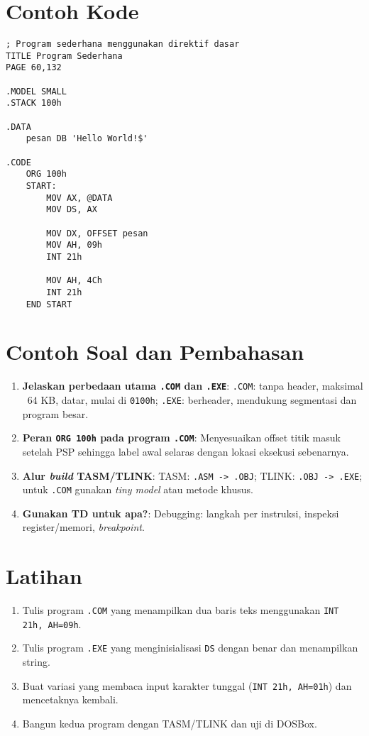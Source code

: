 \section{Contoh Kode}
\begin{verbatim}
; Program sederhana menggunakan direktif dasar
TITLE Program Sederhana
PAGE 60,132

.MODEL SMALL
.STACK 100h

.DATA
    pesan DB 'Hello World!$'

.CODE
    ORG 100h
    START:
        MOV AX, @DATA
        MOV DS, AX
        
        MOV DX, OFFSET pesan
        MOV AH, 09h
        INT 21h
        
        MOV AH, 4Ch
        INT 21h
    END START
\end{verbatim}

\section{Contoh Soal dan Pembahasan}
\begin{enumerate}
  \item \textbf{Jelaskan perbedaan utama \texttt{.COM} dan \texttt{.EXE}}: \texttt{.COM}: tanpa header, maksimal ~64 KB, datar, mulai di \texttt{0100h}; \texttt{.EXE}: berheader, mendukung segmentasi dan program besar.
  \item \textbf{Peran \texttt{ORG 100h} pada program \texttt{.COM}}: Menyesuaikan offset titik masuk setelah PSP sehingga label awal selaras dengan lokasi eksekusi sebenarnya.
  \item \textbf{Alur \textit{build} TASM/TLINK}: TASM: \texttt{.ASM -> .OBJ}; TLINK: \texttt{.OBJ -> .EXE}; untuk \texttt{.COM} gunakan \textit{tiny model} atau metode khusus.
  \item \textbf{Gunakan TD untuk apa?}: Debugging: langkah per instruksi, inspeksi register/memori, \textit{breakpoint}.
\end{enumerate}

\section{Latihan}
\begin{enumerate}
  \item Tulis program \texttt{.COM} yang menampilkan dua baris teks menggunakan \texttt{INT 21h, AH=09h}.
  \item Tulis program \texttt{.EXE} yang menginisialisasi \texttt{DS} dengan benar dan menampilkan string.
  \item Buat variasi yang membaca input karakter tunggal (\texttt{INT 21h, AH=01h}) dan mencetaknya kembali.
  \item Bangun kedua program dengan TASM/TLINK dan uji di DOSBox.
\end{enumerate}

